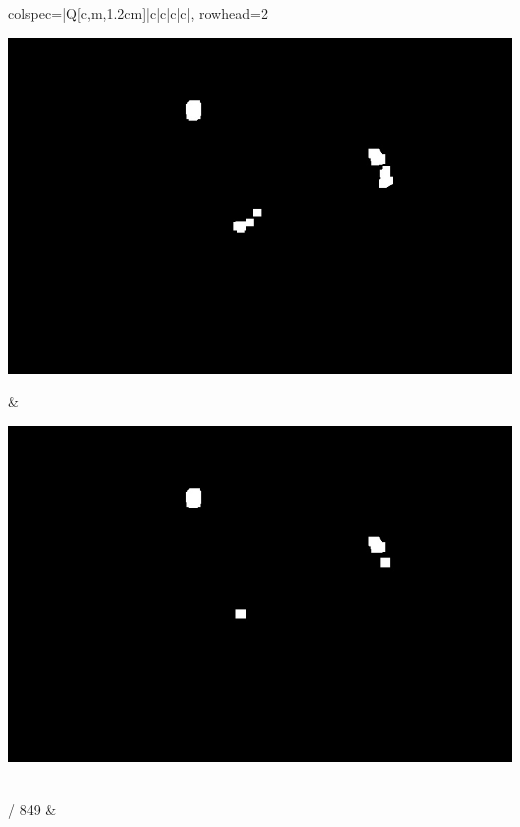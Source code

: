 \begin{longtblr}[
            caption = {Hasil uji coba proses \textit{background subtraction} menggunakan GMM yang disempurnakan oleh Operasi Morfologi},
            label = {tab:gmm_morph_9908}
        ]{
            colspec={|Q[c,m,1.2cm]|c|c|c|c|},
            rowhead=2
        }
\begin{minipage}{0.19\textwidth}
                \includegraphics[width=\linewidth]{image/9866/9866_dilated_5x11_frame789.jpg}
            \end{minipage} & 
            \begin{minipage}{0.19\textwidth}
                \includegraphics[width=\linewidth]{image/9866/9866_dilated_7x13_frame789.jpg}
            \end{minipage} \\
             / 849 &
            \begin{minipage}{0.19\textwidth}

\end{minipage}
\end{longtblr}
